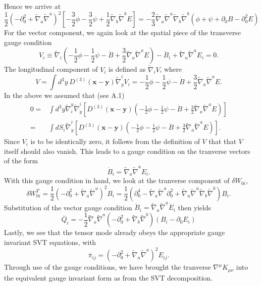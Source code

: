 \documentclass[10pt,letterpaper]{article}
\numberwithin{equation}{subsection}
\begin{document}
Hence we arrive at
\begin{equation}
\boxed{
\frac12 \left(-\partial_0^2+\tilde\nabla_a\tilde\nabla^a\right)^2
\left[ -\frac32 \phi - \frac32\psi  +\frac12 \tilde\nabla_b\tilde\nabla^b E \right]=-\frac{2}{3}\tilde\nabla_a\tilde\nabla^a \tilde\nabla_b\tilde\nabla^b\left( \phi + \psi +\partial_0 B - \partial_0^2 E\right)}
\end{equation}
For the vector component, we again look at the spatial piece of the transverse gauge condition
\begin{equation}
V_i \equiv  \tilde\nabla_i\left( -\frac12 \phi - \frac12 \psi - \dot B + \frac32  \tilde\nabla_a\tilde\nabla^a E\right) - \dot B_i +  \tilde\nabla_a\tilde\nabla^a E_i = 0.
\end{equation}
The longitudinal component of $V_i$ is defined as $\tilde\nabla_i V$, where
\begin{equation}
V = \int d^3y\ D^{(3)}(\mathbf x - \mathbf y)\tilde\nabla_y^i V_i = -\frac12 \phi - \frac12 \psi - \dot B + \frac32  \tilde\nabla_a\tilde\nabla^a E.
\end{equation}
In the above we assumed that (see A.1)
\begin{align}
0=&{}\int d^3y \tilde\nabla_i^y \tilde\nabla^i_y \left[ D^{(3)}(\mathbf x - \mathbf y) \left( -\frac12 \phi - \frac12 \psi - \dot B + \frac32  \tilde\nabla_a\tilde\nabla^a E\right)\right] 
\nonumber\\
=&{} \int dS_i \tilde\nabla^i_y \left[ D^{(3)}(\mathbf x - \mathbf y) \left( -\frac12 \phi - \frac12 \psi - \dot B + \frac32  \tilde\nabla_a\tilde\nabla^a E\right) \right]. 
\end{align}
Since $V_i$ is to be identically zero, it follows from the definition of $V$ that that $V$ itself should also vanish. This leads to a gauge condition on the tranverse vectors of the form
\begin{equation}
\dot B_i = \tilde\nabla_a \tilde\nabla^a E_i.
\end{equation}
With this gauge condition in hand, we look at the tranverse component of $\delta W_{0i}$,
\begin{equation}
\delta W_{0i}^T= \frac12\left( - \partial_0^2 +  \tilde\nabla_a\tilde\nabla^a\right)^2 B_i = \frac{1}{2}\left( \partial_0^4 - \tilde\nabla_a\tilde\nabla^a \partial_0^2
+ \tilde\nabla_a\tilde\nabla^a\tilde\nabla_b\tilde\nabla^b\right) B_i.
\end{equation}
Substitution of the vector gauge condition $\ddot B_i =\tilde\nabla_a \tilde\nabla^a\dot E_i$ then yields
\begin{equation}
\boxed{
\bar Q_i=-\frac{1}{2} \tilde{\nabla}_a\tilde{\nabla}^a\left(-\partial_0^2+\tilde{\nabla}_b\tilde{\nabla}^b\right)(B_i - \partial_0{E}_i)}
\end{equation}
Lastly, we see that the tensor mode already obeys the appropriate gauge invariant SVT equations, with
\begin{equation}
\boxed{
\bar\pi_{ij} =  \left(-\partial_0^2 + \tilde\nabla_a\tilde\nabla^a\right)^2 E_{ij}}.
\end{equation}
Through use of the gauge conditions, we have brought the tranverse $\nabla^\mu K_{\mu\nu}$ into the equivalent gauge invariant form as from the SVT decomposition.
\end{document}
